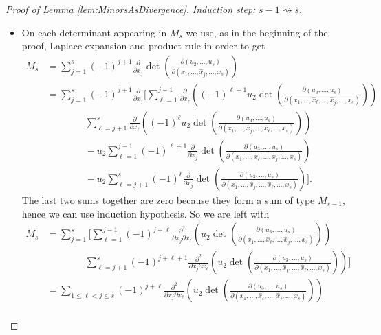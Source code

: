 \begin{proof}[Proof of Lemma \ref{lem:MinorsAsDivergence}]
\textit{Induction step:} $s-1\rightsquigarrow s$.
\begin{itemize}
	\item[] On each determinant appearing in $M_s$ we use, as in the beginning of the proof, Laplace expansion and product rule in order to get
	\begin{align*}
		M_s&=\sum_{j=1}^s{(-1)^{j+1}\frac{\partial}{\partial x_j}\det\left(\frac{\partial(u_2,\dotsc,u_s)}{\partial(x_1,\dotsc,\widehat{x}_j,\dotsc,x_s)}\right)}\\
		&=\sum_{j=1}^s{(-1)^{j+1}\frac{\partial}{\partial x_j}\Biggl[\sum_{\ell=1}^{j-1}{\frac{\partial}{\partial x_\ell}\left((-1)^{\ell+1}u_2\det\left(\frac{\partial(u_3,\dotsc,u_s)}{\partial(x_1,\dotsc,\widehat{x}_\ell,\dotsc,\widehat{x}_j,\dotsc,x_s)}\right)\right)}}\\
		&\qquad\qquad\sum_{\ell=j+1}^s{\frac{\partial}{\partial x_\ell}\left((-1)^\ell u_2\det\left(\frac{\partial(u_3,\dotsc,u_s)}{\partial(x_1,\dotsc,\widehat{x}_j,\dotsc,\widehat{x}_\ell,\dotsc,x_s)}\right)\right)}\\
		&\qquad\qquad-u_2\sum_{\ell=1}^{j-1}{(-1)^{\ell+1}\frac{\partial}{\partial x_j}\det\left(\frac{\partial(u_3,\dotsc,u_s)}{\partial(x_1,\dotsc,\widehat{x}_\ell,\dotsc,\widehat{x}_j,\dotsc,x_s)}\right)}\\
		&\qquad\qquad-u_2\sum_{\ell=j+1}^s{(-1)^\ell\frac{\partial}{\partial x_j}\det\left(\frac{\partial(u_3,\dotsc,u_s)}{\partial(x_1,\dotsc,\widehat{x}_j,\dotsc,\widehat{x}_\ell,\dotsc,x_s)}\right)}\Biggr].
	\end{align*}
	The last two sums together are zero because they form a sum of type $M_{s-1}$, hence we can use induction hypothesis. So we are left with
	\begin{align*}
		M_s&=\sum_{j=1}^s{\Biggl[\sum_{\ell=1}^{j-1}{(-1)^{j+\ell}\frac{\partial^2}{\partial x_j\partial x_\ell}\left(u_2\det\left(\frac{\partial(u_3,\dotsc,u_s)}{\partial(x_1,\dotsc,\widehat{x}_\ell,\dotsc,\widehat{x}_j,\dotsc,x_s)}\right)\right)}}\\
		&\qquad\qquad\sum_{\ell=j+1}^s{(-1)^{j+\ell+1}\frac{\partial^2}{\partial x_j\partial x_\ell}\left(u_2\det\left(\frac{\partial(u_3,\dotsc,u_s)}{\partial(x_1,\dotsc,\widehat{x}_j,\dotsc,\widehat{x}_\ell,\dotsc,x_s)}\right)\right)}\Biggr]\\
		&=\sum_{1\leq\ell<j\leq s}{(-1)^{j+\ell}\frac{\partial^2}{\partial x_j\partial x_\ell}\left(u_2\det\left(\frac{\partial(u_3,\dotsc,u_s)}{\partial(x_1,\dotsc,\widehat{x}_\ell,\dotsc,\widehat{x}_j,\dotsc,x_s)}\right)\right)}\\

\end{align*}
\end{itemize}
\end{proof}
